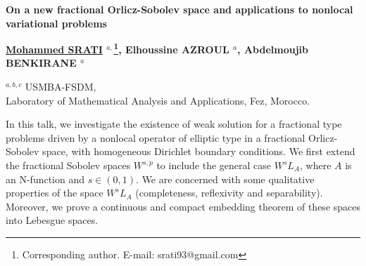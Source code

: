 \documentclass [12pt]{article}
\numberwithin{equation}{section}
\begin{document}
\pagestyle{fancy}
\fancyhf{}
\begin{center}
\end{center}
\rhead{}

\vspace*{2cm} \normalsize \centerline{ \bf On a new fractional Orlicz-Sobolev space and applications to nonlocal variational problems}
\vspace*{1cm}

\centerline{\bf \underline{Mohammed SRATI} $^{a,}$\footnote{Corresponding author. E-mail: srati93@gmail.com},  Elhoussine AZROUL  $^a$, Abdelmoujib BENKIRANE $^a$}

\vspace*{0.5cm}

\centerline{$^{a,b,c}$  USMBA-FSDM,
 \\ Laboratory of Mathematical Analysis and Applications, Fez, Morocco.}






\vspace*{1cm}

In this talk, we investigate the existence of weak solution for a fractional type problems driven by a nonlocal  operator of elliptic type in a fractional Orlicz-Sobolev space, with homogeneous Dirichlet boundary conditions.
 We first  extend the fractional Sobolev spaces  $W^{s,p}$ to include the general  case $W^sL_A$, where $A$ is an N-function and $s\in (0,1)$. We are concerned with some qualitative properties of the space $W^sL_A$ (completeness, reflexivity and separability). Moreover,  we prove a continuous and compact embedding theorem of these spaces into Lebesgue spaces.
\end{document}
